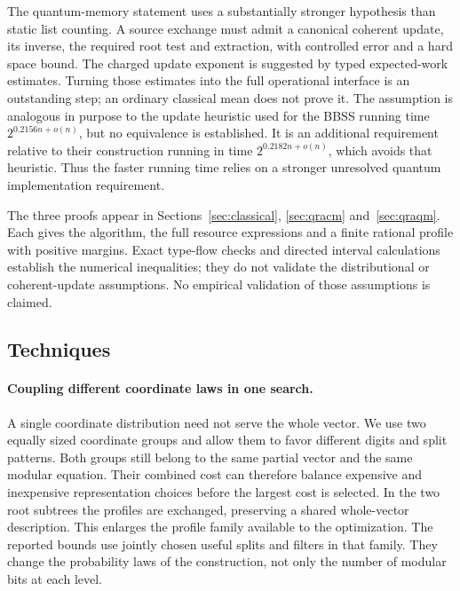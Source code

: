 \documentclass[10pt,a4paper]{article}
\theoremstyle{definition}
\begin{document}
The quantum-memory statement uses a substantially stronger hypothesis
than static list counting. A source exchange must admit a canonical
coherent update, its inverse, the required root test and extraction,
with controlled error and a hard space bound. The charged update
exponent is suggested by typed expected-work estimates. Turning those
estimates into the full operational interface is an outstanding step;
an ordinary classical mean does not prove it. The assumption is
analogous in purpose to the update heuristic used for the BBSS running time
$2^{0.2156n+o(n)}$, but no equivalence is established. It is an additional
requirement relative to their construction running in time
$2^{0.2182n+o(n)}$, which avoids that heuristic. Thus the faster running time relies on a stronger unresolved quantum
implementation requirement.

The three proofs appear in Sections~\ref{sec:classical},
\ref{sec:qracm} and~\ref{sec:qraqm}. Each gives the algorithm, the full
resource expressions and a finite rational profile with positive margins.
Exact type-flow checks and directed interval calculations establish the
numerical inequalities; they do not
validate the distributional or coherent-update assumptions. No empirical
validation of those assumptions is claimed.

\subsection{Techniques}
\paragraph{Coupling different coordinate laws in one search.}
A single coordinate distribution need not serve the whole vector. We use
two equally sized coordinate groups and allow them to favor different
digits and split patterns. Both groups still belong to the same partial
vector and the same modular equation. Their combined cost can therefore
balance expensive and inexpensive representation choices before the
largest cost is selected. In the two root subtrees the profiles are
exchanged, preserving a shared whole-vector description. This enlarges the profile family available to the optimization. The
reported bounds use jointly chosen useful splits and filters in that
family. They change the probability laws of the construction, not only
the number of modular bits at each level.
\end{document}
